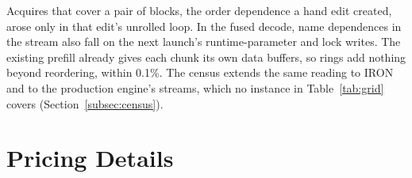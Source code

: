 Acquires that cover a pair of blocks, the order dependence a hand edit created, arose only in that edit's unrolled loop.
In the fused decode, name dependences in the stream also fall on the next launch's runtime-parameter and lock writes.
The existing prefill already gives each chunk its own data buffers, so rings add nothing beyond reordering, within 0.1\%.
The census extends the same reading to IRON and to the production engine's streams, which no instance in Table~\ref{tab:grid} covers (Section~\ref{subsec:census}).

\section{Pricing Details}
\label{app:pricing-details}

